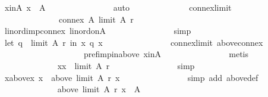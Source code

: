 \begin{isabellebody}
\ x{\isacharunderscore}{\kern0pt}in{\isacharunderscore}{\kern0pt}A{\isacharcolon}{\kern0pt}\ {\isachardoublequoteopen}x\ {\isasymin}\ A{\isachardoublequoteclose}\isanewline
\ \ \ \ \ \ \ \ \ \ \ \ \ \ \isamarkupfalse%
\ auto\isanewline
\ \ \ \ \ \ \ \ \ \ \ \ \isamarkupfalse%
\ connex{\isacharunderscore}{\kern0pt}limit{\isacharcolon}{\kern0pt}\isanewline
\ \ \ \ \ \ \ \ \ \ \ \ \ \ {\isachardoublequoteopen}connex\ A\ {\isacharparenleft}{\kern0pt}limit\ A\ r{\isacharparenright}{\kern0pt}{\isachardoublequoteclose}\isanewline
\ \ \ \ \ \ \ \ \ \ \ \ \ \ \isamarkupfalse%
\ lin{\isacharunderscore}{\kern0pt}ord{\isacharunderscore}{\kern0pt}imp{\isacharunderscore}{\kern0pt}connex\ lin{\isacharunderscore}{\kern0pt}ord{\isacharunderscore}{\kern0pt}on{\isacharunderscore}{\kern0pt}A\isanewline
\ \ \ \ \ \ \ \ \ \ \ \ \ \ \isamarkupfalse%
\ simp\isanewline
\ \ \ \ \ \ \ \ \ \ \ \ \isamarkupfalse%
\ {\isachardoublequoteopen}let\ q\ {\isacharequal}{\kern0pt}\ limit\ A\ r\ in\ x\ {\isasympreceq}\isactrlsub q\ x{\isachardoublequoteclose}\isanewline
\ \ \ \ \ \ \ \ \ \ \ \ \ \ \isamarkupfalse%
\ connex{\isacharunderscore}{\kern0pt}limit\ above{\isacharunderscore}{\kern0pt}connex\isanewline
\ \ \ \ \ \ \ \ \ \ \ \ \ \ \ \ \ \ \ \ pref{\isacharunderscore}{\kern0pt}imp{\isacharunderscore}{\kern0pt}in{\isacharunderscore}{\kern0pt}above\ x{\isacharunderscore}{\kern0pt}in{\isacharunderscore}{\kern0pt}A\isanewline
\ \ \ \ \ \ \ \ \ \ \ \ \ \ \isamarkupfalse%
\ metis\isanewline
\ \ \ \ \ \ \ \ \ \ \ \ \isamarkupfalse%
\ {\isachardoublequoteopen}{\isacharparenleft}{\kern0pt}x{\isacharcomma}{\kern0pt}x{\isacharparenright}{\kern0pt}\ {\isasymin}\ limit\ A\ r{\isachardoublequoteclose}\isanewline
\ \ \ \ \ \ \ \ \ \ \ \ \ \ \isamarkupfalse%
\ simp\isanewline
\ \ \ \ \ \ \ \ \ \ \ \ \isamarkupfalse%
\ x{\isacharunderscore}{\kern0pt}above{\isacharunderscore}{\kern0pt}x{\isacharcolon}{\kern0pt}\ {\isachardoublequoteopen}x\ {\isasymin}\ above\ {\isacharparenleft}{\kern0pt}limit\ A\ r{\isacharparenright}{\kern0pt}\ x{\isachardoublequoteclose}\isanewline
\ \ \ \ \ \ \ \ \ \ \ \ \ \ \isamarkupfalse%
\ {\isacharparenleft}{\kern0pt}simp\ add{\isacharcolon}{\kern0pt}\ above{\isacharunderscore}{\kern0pt}def{\isacharparenright}{\kern0pt}\isanewline
\ \ \ \ \ \ \ \ \ \ \ \ \isamarkupfalse%
\ {\isachardoublequoteopen}above\ {\isacharparenleft}{\kern0pt}limit\ A\ r{\isacharparenright}{\kern0pt}\ x\ {\isasymsubseteq}\ A{\isachardoublequoteclose}\isanewline

\end{isabellebody}
